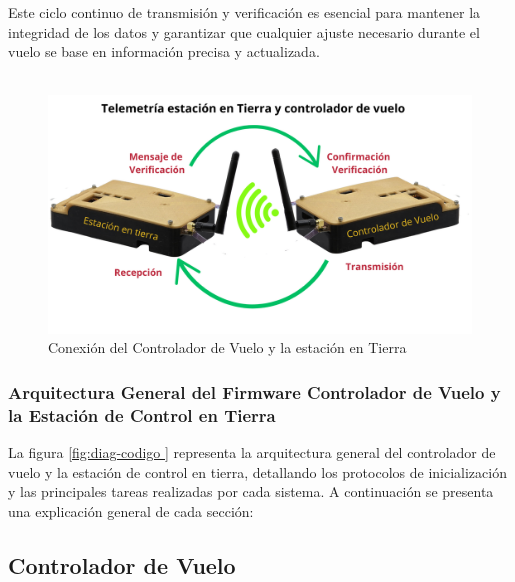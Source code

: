         Este ciclo continuo de transmisión y verificación es esencial para mantener la integridad de los datos y garantizar que cualquier ajuste necesario durante el vuelo se base en información precisa y actualizada.\\ \\ 
        \begin{figure}[H]
            \centering
            \includegraphics[width=\textwidth]{Imagenes/Metodologia/estacion en tierra.png}
            \caption{Conexión del Controlador de Vuelo y la estación en Tierra}
            \label{fig:estacion en tierra}
        \end{figure} 

    \subsubsection{Arquitectura General del Firmware Controlador de Vuelo y la Estación de Control en Tierra} 
        La figura \ref{fig:diag-codigo } representa la arquitectura general del controlador de vuelo y la estación de control en tierra, detallando los protocolos de inicialización y las principales tareas realizadas por cada sistema. A continuación se presenta una explicación general de cada sección:

\subsection{Controlador de Vuelo}

